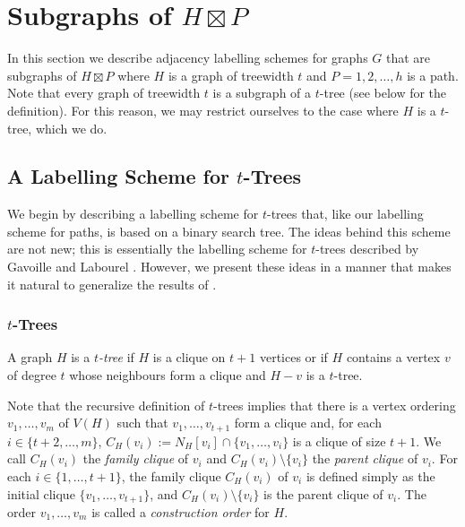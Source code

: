 \documentclass[kpfonts]{patmorin}
\begin{document}
\section{Subgraphs of $H\boxtimes P$}

In this section we describe adjacency labelling schemes for graphs $G$ that are subgraphs of $H\boxtimes P$ where $H$ is a graph of treewidth $t$ and $P=1,2,\ldots,h$ is a path.
Note that every graph of treewidth $t$ is a subgraph of a $t$-tree (see below for the definition). For this reason, we may restrict ourselves to the case where $H$ is a $t$-tree, which we do.


\subsection{A Labelling Scheme for $t$-Trees}

We begin by describing a labelling scheme for $t$-trees that, like our labelling scheme for paths, is based on a binary search tree.  The ideas behind this scheme are not new; this is essentially the labelling scheme for $t$-trees described by Gavoille and Labourel \cite{gavoille.labourel:shorter}.  However, we present these ideas in a manner that makes it natural to generalize the results of .

\subsubsection{$t$-Trees}

A graph $H$ is a \emph{$t$-tree} if $H$ is a clique on $t+1$ vertices or if $H$ contains a vertex $v$ of degree $t$ whose neighbours form a clique and $H-v$ is a $t$-tree.

Note that the recursive definition of $t$-trees implies that there is a vertex ordering $v_1,\ldots,v_{m}$ of $V(H)$ such that $v_1,\ldots,v_{t+1}$ form a clique and, for each $i\in\{t+2,\ldots,m\}$, $C_H(v_i):=N_H[v_i]\cap \{v_1,\ldots,v_{i}\}$ is a clique of size $t+1$.  We call $C_H(v_i)$ the \emph{family clique} of $v_i$ and $C_H(v_i)\setminus\{v_i\}$ the \emph{parent clique} of $v_i$. For each $i\in\{1,\ldots,t+1\}$, the family clique $C_H(v_i)$ of $v_i$ is defined simply as the initial clique $\{v_1,\ldots,v_{t+1}\}$, and $C_H(v_i)\setminus\{v_i\}$ is the parent clique of $v_i$. The order $v_1,\ldots,v_m$ is called a \emph{construction order} for $H$.
\end{document}

